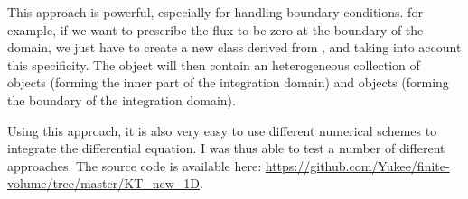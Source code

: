 This approach is powerful, especially for handling boundary conditions. for example, if we want to prescribe the flux to be zero at the boundary of the domain, we just have to create a new class  derived from , and taking into account this specificity. The  object will then contain an heterogeneous collection of  objects (forming the inner part of the integration domain) and  objects (forming the boundary of the integration domain).

Using this approach, it is also very easy to use different numerical schemes to integrate the differential equation. I was thus able to test a number of different approaches. The source code is available here: \url{https://github.com/Yukee/finite-volume/tree/master/KT_new_1D}.
